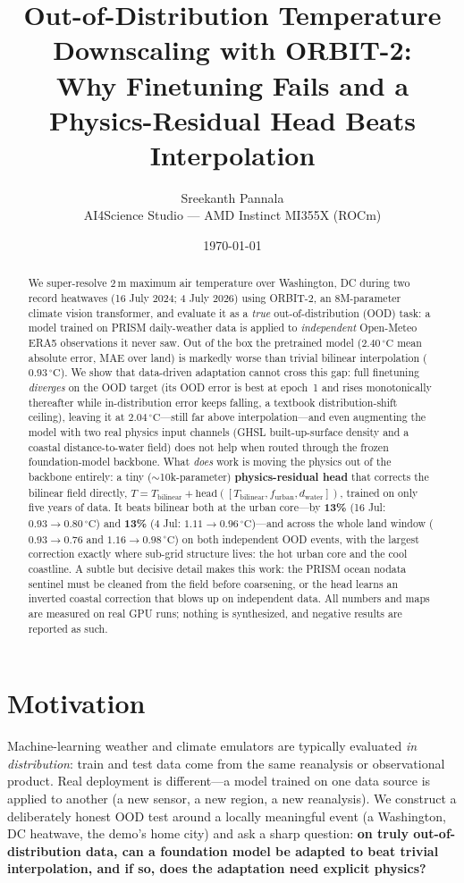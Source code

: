 \documentclass[11pt]{article}
\title{\vspace{-1.5em}\textbf{Out-of-Distribution Temperature Downscaling with
ORBIT-2:\\ Why Finetuning Fails and a Physics-Residual Head Beats Interpolation}}
\author{Sreekanth Pannala \\ \small AI4Science Studio --- AMD Instinct MI355X (ROCm)}
\date{\today}
\begin{document}
\maketitle
\thispagestyle{fancy}

\begin{abstract}
\noindent
We super-resolve $2\,\mathrm{m}$ maximum air temperature over Washington, DC
during two record heatwaves (16 July 2024; 4 July 2026) using ORBIT-2, an
8M-parameter climate vision transformer, and evaluate it as a \emph{true}
out-of-distribution (OOD) task: a model trained on PRISM daily-weather data is
applied to \emph{independent} Open-Meteo ERA5 observations it never saw. Out of
the box the pretrained model ($2.40\,^\circ\mathrm{C}$ mean absolute error, MAE
over land) is markedly worse than trivial bilinear interpolation
($0.93\,^\circ\mathrm{C}$). We show that data-driven adaptation cannot cross this
gap: full finetuning \emph{diverges} on the OOD target (its OOD error is best at
epoch~1 and rises monotonically thereafter while in-distribution error keeps
falling, a textbook distribution-shift ceiling), leaving it at
$2.04\,^\circ\mathrm{C}$---still far above interpolation---and even augmenting the
model with two real physics input channels (GHSL built-up-surface density and a
coastal distance-to-water field) does not help when routed through the frozen
foundation-model backbone. What \emph{does} work is moving the physics out of the
backbone entirely: a tiny ($\sim$10k-parameter) \textbf{physics-residual head}
that corrects the bilinear field directly, $T=T_\text{bilinear}+\text{head}(
[T_\text{bilinear}, f_\text{urban}, d_\text{water}])$, trained on only five years
of data. It beats bilinear both at the urban core---by \textbf{13\%} (16 Jul:
$0.93\!\to\!0.80\,^\circ\mathrm{C}$) and \textbf{13\%} (4 Jul:
$1.11\!\to\!0.96\,^\circ\mathrm{C}$)---and across the whole land window
($0.93\!\to\!0.76$ and $1.16\!\to\!0.98\,^\circ\mathrm{C}$) on both independent
OOD events, with the largest correction exactly where sub-grid structure lives:
the hot urban core and the cool coastline. A subtle but decisive detail makes this
work: the PRISM ocean nodata sentinel must be cleaned from the field before
coarsening, or the head learns an inverted coastal correction that blows up on
independent data. All numbers and maps are measured on real GPU runs; nothing is
synthesized, and negative results are reported as such.
\end{abstract}

\section{Motivation}
Machine-learning weather and climate emulators are typically evaluated
\emph{in distribution}: train and test data come from the same reanalysis or
observational product. Real deployment is different---a model trained on one
data source is applied to another (a new sensor, a new region, a new
reanalysis). We construct a deliberately honest OOD test around a locally
meaningful event (a Washington, DC heatwave, the demo's home city) and ask a
sharp question: \textbf{on truly out-of-distribution data, can a foundation model
be adapted to beat trivial interpolation, and if so, does the adaptation need
explicit physics?}
\end{document}
